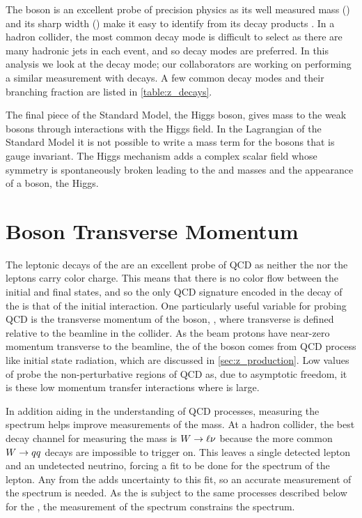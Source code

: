 The \Z boson is an excellent probe of precision physics as its well measured
mass (\Zmass) and its sharp width (\Zwidth) make it easy to identify from its
decay products \cite{pdg2014}. In a hadron collider, the most common \Ztoqq
decay mode is difficult to select as there are many hadronic jets in each
event, and so \Ztoll decay modes are preferred. In this analysis we look at the
\Ztoee decay mode; our collaborators are working on performing a similar
measurement with \Ztomumu decays. A few common decay modes and their branching
fraction are listed in \cref{table:z_decays}.



The final piece of the Standard Model, the Higgs boson, gives mass to the weak
bosons through interactions with the Higgs field. In the Lagrangian of the
Standard Model it is not possible to write a mass term for the bosons
that is gauge invariant. The Higgs mechanism adds a complex scalar field whose
symmetry is spontaneously broken leading to the \W and \Z masses and the
appearance of a \spinzero boson, the Higgs.

\section{\texorpdfstring{\Z}{Z} Boson Transverse Momentum}

The leptonic decays of the \Z are an excellent probe of QCD as neither the \Z
nor the leptons carry color charge. This means that there is no color flow
between the initial and final states, and so the only QCD signature encoded in
the decay of the \Z is that of the initial interaction. One particularly useful
variable for probing QCD is the transverse momentum of the \Z boson, \bosonpt,
where transverse is defined relative to the beamline in the collider. As the
beam protons have near-zero momentum transverse to the beamline, the \bosonpt
of the \Z boson comes from QCD process like initial state radiation, which are
discussed in \cref{sec:z_production}. Low values of \bosonpt probe the
non-perturbative regions of QCD as, due to asymptotic freedom, it is these low
momentum transfer interactions where \alphastrong is large.

In addition aiding in the understanding of QCD processes, measuring the \Z
\bosonpt spectrum helps improve measurements of the \W mass. At a hadron
collider, the best decay channel for measuring the \W mass is ${W \to \ell \nu}$ because
the more common ${W \to q q}$ decays are impossible to trigger on. This leaves a
single detected lepton and an undetected neutrino, forcing a fit to be done for
the \pt spectrum of the lepton. Any \bosonpt from the \W adds uncertainty to
this fit, so an accurate measurement of the \W \bosonpt spectrum is needed. As
the \W is subject to the same processes described below for the \Z, the
measurement of the \Z \bosonpt spectrum constrains the \W \bosonpt spectrum.

